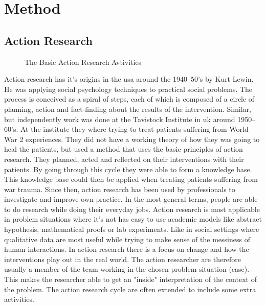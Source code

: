 \chapter{Method}
\section{Action Research}	
\begin{figure}
\centering
\caption{The Basic Action Research Avtivities}
\label{fig:basicactivity}
\end{figure}
Action research has it's origins in the \gls{usa} around the 1940--50's by Kurt Lewin.
He was applying social psychology techniques to practical social problems. 
The process is conceived as a spiral of steps, each of which is composed of a circle of planning, action and fact-finding about the results of the intervention.
Similar, but independently work was done at the Tavistock Institute in \gls{uk} around 1950--60's.
At the institute they where trying to treat patients suffering from World War 2 experiences. 
They did not have a working theory of how they was going to heal the patients, but used a method that uses the basic principles of action research.
They planned, acted and reflected on their interventions with their patients. 
By going through this cycle they were able to form a knowledge base.
This knowledge base could then be applied when treating patients suffering from war trauma.
Since then, action research has been used by professionals to investigate and improve own practice.
In the most general terms, people are able to do research while doing their everyday jobs.
Action research is most applicable in problem situations where it's not has easy to use academic models like abstract hypothesis, mathematical proofs or lab experiments. Like in social settings where qualitative data are most useful while trying to make sense of the messiness of human interactions.
In action research there is a focus on change and how the interventions play out in the real world.
The action researcher are therefore usually a member of the team working in the chosen problem situation (case).
This makes the researcher able to get an "inside" interpretation of the context of the problem.
The action research cycle are often extended to include some extra activities. 
